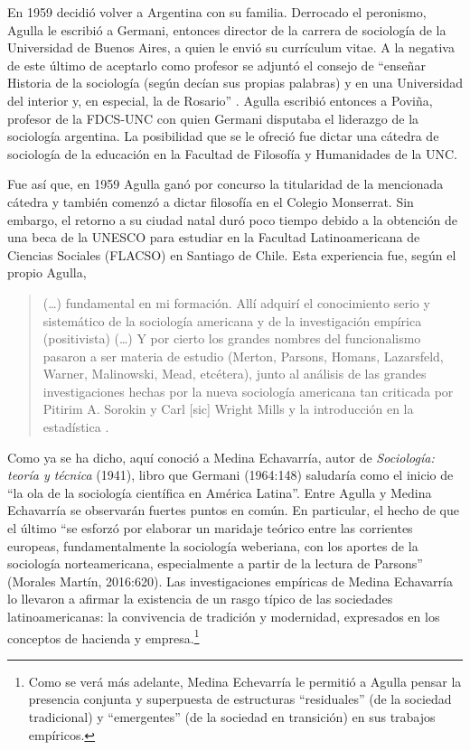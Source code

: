 En 1959 decidió volver a Argentina con su familia. Derrocado el peronismo, Agulla le escribió a Germani, entonces director de la carrera de sociología de la Universidad de Buenos Aires, a quien le envió su currículum vitae. A la negativa de este último de aceptarlo como profesor se adjuntó el consejo de \enquote{enseñar Historia de la sociología (según decían sus propias palabras) y en una Universidad del interior y, en especial, la de Rosario} \parencite[77]{1634-AGULLA1997}. Agulla escribió entonces a Poviña, profesor de la FDCS-UNC con quien Germani disputaba el liderazgo de la sociología argentina. La posibilidad que se le ofreció fue dictar una cátedra de sociología de la educación en la Facultad de Filosofía y Humanidades de la UNC.

Fue así que, en 1959 Agulla ganó por concurso la titularidad de la mencionada cátedra y también comenzó a dictar filosofía en el Colegio Monserrat. Sin embargo, el retorno a su ciudad natal duró poco tiempo debido a la obtención de una beca de la UNESCO para estudiar en la Facultad Latinoamericana de Ciencias Sociales (FLACSO) en Santiago de Chile. Esta experiencia fue, según el propio Agulla,

\begin{quote}
(\dots) fundamental en mi formación. Allí adquirí el conocimiento serio y sistemático de la sociología americana y de la investigación empírica (positivista) (\dots) Y por cierto los grandes nombres del funcionalismo pasaron a ser materia de estudio (Merton, Parsons, Homans, Lazarsfeld, Warner, Malinowski, Mead, etcétera), junto al análisis de las grandes investigaciones hechas por la nueva sociología americana tan criticada por Pitirim A. Sorokin y Carl [sic] Wright Mills y la introducción en la estadística \parencite[83]{1634-AGULLA1997}.
\end{quote}

Como ya se ha dicho, aquí conoció a Medina Echavarría, autor de \emph{Sociología: teoría y técnica} (1941), libro que Germani (1964:148) saludaría como el inicio de \enquote{la ola de la sociología científica en América Latina}. Entre Agulla y Medina Echavarría se observarán fuertes puntos en común. En particular, el hecho de que el último \enquote{se esforzó por elaborar un maridaje teórico entre las corrientes europeas, fundamentalmente la sociología weberiana, con los aportes de la sociología norteamericana, especialmente a partir de la lectura de Parsons} (Morales Martín, 2016:620). Las investigaciones empíricas de Medina Echavarría lo llevaron a afirmar la existencia de un rasgo típico de las sociedades latinoamericanas: la convivencia de tradición y modernidad, expresados en los conceptos de hacienda y empresa.\footnote{Como se verá más adelante, Medina Echevarría le permitió a Agulla pensar la presencia conjunta y superpuesta de estructuras \enquote{residuales} (de la sociedad tradicional) y \enquote{emergentes} (de la sociedad en transición) en sus trabajos empíricos.}

